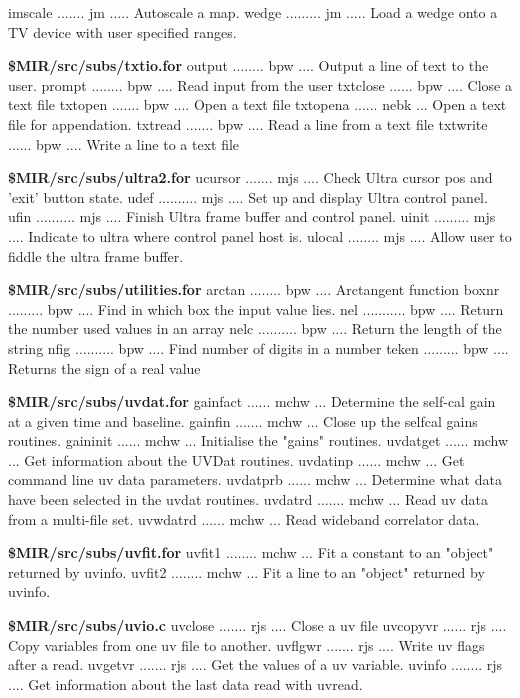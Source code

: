 {\eightpoint\begintt
imscale ....... jm ..... Autoscale a map.
wedge ......... jm ..... Load a wedge onto a TV device with user specified ranges.
\endtt}
\par{\bf \$MIR/src/subs/txtio.for}
{\eightpoint\begintt
output ........ bpw .... Output a line of text to the user.
prompt ........ bpw .... Read input from the user
txtclose ...... bpw .... Close a text file
txtopen ....... bpw .... Open a text file
txtopena ...... nebk ... Open a text file for appendation.
\endtt}
{\eightpoint\begintt
txtread ....... bpw .... Read a line from a text file
txtwrite ...... bpw .... Write a line to a text file
\endtt}
\par{\bf \$MIR/src/subs/ultra2.for}
{\eightpoint\begintt
ucursor ....... mjs .... Check Ultra cursor pos and 'exit' button state.
udef .......... mjs .... Set up and display Ultra control panel.
ufin .......... mjs .... Finish Ultra frame buffer and control panel.
uinit ......... mjs .... Indicate to ultra where control panel host is.
ulocal ........ mjs .... Allow user to fiddle the ultra frame buffer.
\endtt}
\par{\bf \$MIR/src/subs/utilities.for}
{\eightpoint\begintt
arctan ........ bpw .... Arctangent function
boxnr ......... bpw .... Find in which box the input value lies.
nel ........... bpw .... Return the number used values in an array
nelc .......... bpw .... Return the length of the string
nfig .......... bpw .... Find number of digits in a number
\endtt}
{\eightpoint\begintt
teken ......... bpw .... Returns the sign of a real value
\endtt}
\par{\bf \$MIR/src/subs/uvdat.for}
{\eightpoint\begintt
gainfact ...... mchw ... Determine the self-cal gain at a given time and baseline.
gainfin ....... mchw ... Close up the selfcal gains routines.
gaininit ...... mchw ... Initialise the "gains" routines.
uvdatget ...... mchw ... Get information about the UVDat routines.
uvdatinp ...... mchw ... Get command line uv data parameters.
\endtt}
{\eightpoint\begintt
uvdatprb ...... mchw ... Determine what data have been selected in the uvdat routines.
uvdatrd ....... mchw ... Read uv data from a multi-file set.
uvwdatrd ...... mchw ... Read wideband correlator data.
\endtt}
\par{\bf \$MIR/src/subs/uvfit.for}
{\eightpoint\begintt
uvfit1 ........ mchw ... Fit a constant to an "object" returned by uvinfo.
uvfit2 ........ mchw ... Fit a line to an "object" returned by uvinfo.
\endtt}
\par{\bf \$MIR/src/subs/uvio.c}
{\eightpoint\begintt
uvclose ....... rjs .... Close a uv file
uvcopyvr ...... rjs .... Copy variables from one uv file to another.
uvflgwr ....... rjs .... Write uv flags after a read.
uvgetvr ....... rjs .... Get the values of a uv variable.
uvinfo ........ rjs .... Get information about the last data read with uvread.
\endtt}
